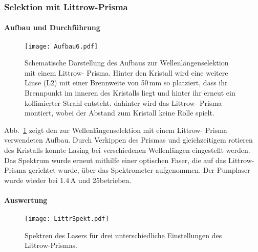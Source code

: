 \subsubsection{Selektion mit Littrow-Prisma}

\paragraph{Aufbau und Durchführung}

\begin{figure}[H]
\begin{center}
  \texttt{[image: Aufbau6.pdf]}
  \caption{Schematische Darstellung des Aufbaus zur Wellenlängenselektion mit einem Littrow-
  Prisma. Hinter den Kristall wird eine weitere Linse (L2) mit einer Brennweite von 50\,mm so
  platziert, dass ihr Brennpunkt im inneren des Kristalls liegt und hinter ihr erneut ein
  kollimierter Strahl entsteht. dahinter wird das Littrow- Prisma montiert, wobei der Abstand zum
  Kristall keine Rolle spielt.}
  \label{img:aufbau6}
\end{center}
\end{figure}

Abb.~\ref{img:aufbau6} zeigt den zur Wellenlängenselektion mit einem Littrow- Prisma verwendeten
Aufbau. Durch Verkippen des Prismas und gleichzeitigem rotieren des Kristalls konnte Lasing bei
verschiedenen Wellenlängen eingestellt werden. Das Spektrum wurde erneut mithilfe einer optischen
Faser, die auf das Littrow- Prisma gerichtet wurde, über das Spektrometer aufgenommen. Der
Pumplaser wurde wieder bei 1.4\,A und 25\grad betrieben.



\paragraph{Auswertung}



\begin{figure}[H]
\begin{center}
  \texttt{[image: LittrSpekt.pdf]}
  \caption{Spektren des Lasers für drei unterschiedliche Einstellungen des Littrow-Prismas.}
  \label{img:LittrSpekt}
\end{center}
\end{figure}
